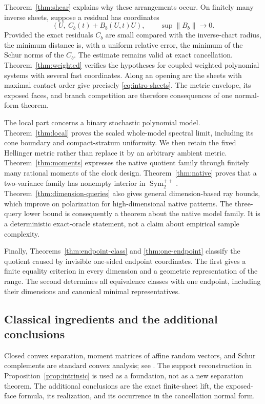 \documentclass[11pt,reqno]{amsart}
\numberwithin{equation}{section}
\theoremstyle{definition}
\theoremstyle{remark}
\newcommand{\Sym}{\operatorname{Sym}}
\begin{document}
Theorem~\ref{thm:shear} explains why these arrangements occur. On finitely many inverse sheets, suppose a residual has coordinates
\[
 (U,\ C_b(t)+B_b(U,t)U),\qquad \sup\|B_b\|\longrightarrow0.
\]
Provided the exact residuals $C_b$ are small compared with the inverse-chart radius, the minimum distance is, with a uniform relative error, the minimum of the Schur norms of the $C_b$. The estimate remains valid at exact cancellation. Theorem~\ref{thm:weighted} verifies the hypotheses for coupled weighted polynomial systems with several fast coordinates. Along an opening arc the sheets with maximal contact order give precisely \eqref{eq:intro-sheets}. The metric envelope, its exposed faces, and branch competition are therefore consequences of one normal-form theorem.

The local part concerns a binary stochastic polynomial model. Theorem~\ref{thm:local} proves the scaled whole-model spectral limit, including its cone boundary and compact-stratum uniformity. We then retain the fixed Hellinger metric rather than replace it by an arbitrary ambient metric. Theorem~\ref{thm:moments} expresses the native quotient family through finitely many rational moments of the clock design. Theorem~\ref{thm:native} proves that a two-variance family has nonempty interior in $\Sym_2^{++}$. Theorem~\ref{thm:dimension-queries} also gives general dimension-based ray bounds, which improve on polarization for high-dimensional native patterns. The three-query lower bound is consequently a theorem about the native model family. It is a deterministic exact-oracle statement, not a claim about empirical sample complexity.

Finally, Theorems~\ref{thm:endpoint-class} and \ref{thm:one-endpoint} classify the quotient caused by invisible one-sided endpoint coordinates. The first gives a finite equality criterion in every dimension and a geometric representation of the range. The second determines all equivalence classes with one endpoint, including their dimensions and canonical minimal representatives.

\subsection*{Classical ingredients and the additional conclusions}
Closed convex separation, moment matrices of affine random vectors, and Schur complements are standard convex analysis; see \cite{BV}. The support reconstruction in Proposition~\ref{prop:intrinsic} is used as a foundation, not as a new separation theorem. The additional conclusions are the exact finite-sheet lift, the exposed-face formula, its realization, and its occurrence in the cancellation normal form.
\end{document}
